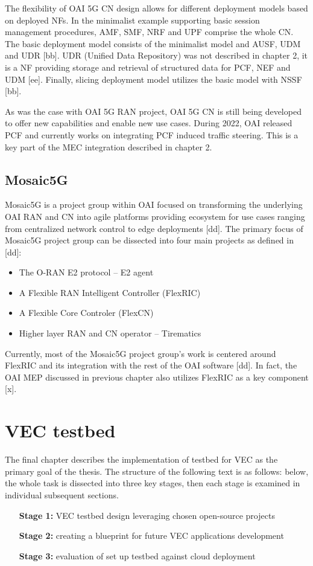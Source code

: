 \documentclass[12pt,a4paper,twoside]{report}
\begin{document}
The flexibility of OAI 5G CN design allows for different deployment models based on deployed NFs. In the minimalist example supporting basic session management procedures, AMF, SMF, NRF and UPF comprise the whole CN. The basic deployment model consists of the minimalist model and AUSF, UDM and UDR [bb]. UDR (Unified Data Repository) was not described in chapter 2, it is a NF providing storage and retrieval of structured data for PCF, NEF and UDM [ee]. Finally, slicing deployment model utilizes the basic model with NSSF [bb]. 

As was the case with OAI 5G RAN project, OAI 5G CN is still being developed to offer new capabilities and enable new use cases. During 2022, OAI released PCF and currently works on integrating PCF induced traffic steering. This is a key part of the MEC integration described in chapter 2.
\section{Mosaic5G}
Mosaic5G is a project group within OAI focused on transforming the underlying OAI RAN and CN into agile platforms providing ecosystem for use cases ranging from centralized network control to edge deployments [dd]. The primary focus of Mosaic5G project group can be dissected into four main projects as defined in [dd]:
\begin{itemize}
	\item The O-RAN E2 protocol – E2 agent
	\item A Flexible RAN Intelligent Controller (FlexRIC)
	\item A Flexible Core Controler (FlexCN)
	\item Higher layer RAN and CN operator – Tirematics
\end{itemize}
Currently, most of the Mosaic5G project group’s work is centered around FlexRIC and its integration with the rest of the OAI software [dd]. In fact, the OAI MEP discussed in previous chapter also utilizes FlexRIC as a key component [x]. 
\chapter{VEC testbed}
The final chapter describes the implementation of testbed for VEC as the primary goal of the thesis. The structure of the following text is as follows: below, the whole task is dissected into three key stages, then each stage is examined in individual subsequent sections.
\begin{itemize}
	\item[\textbf{Stage 1:}] VEC testbed design leveraging chosen open-source projects 
	\item[\textbf{Stage 2:}] creating a blueprint for future VEC applications development
	\item[\textbf{Stage 3:}]  evaluation of set up testbed against cloud deployment
\end{itemize}
\end{document}
